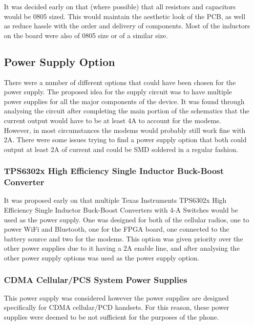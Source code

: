 It was decided early on that (where possible) that all resistors and capacitors would be 0805 sized. 
This would maintain the aesthetic look of the PCB, as well as reduce hassle with the order and delivery of components. 
Most of the inductors on the board were also of 0805 size or of a similar size. 


\subsection{Power Supply Option}

	There were a number of different options that could have been chosen for the power supply. 
The proposed idea for the supply circuit was to have multiple power supplies for all the major components of the device. 
It was found through analysing the circuit after completing the main portion of the schematics that the current output would have to be at least 4A to account for the modems. 
However, in most circumstances the modems would probably still work fine with 2A. 
There were some issues trying to find a power supply option that both could output at least 2A of current and could be SMD soldered in a regular fashion. 

\subsubsection{TPS6302x High Efficiency Single Inductor Buck-Boost Converter}

It was proposed early on that multiple Texas Instruments TPS6302x High Efficiency Single Inductor Buck-Boost Converters with 4-A Switches would be used as the power supply. 
One was designed for both of the cellular radios, one to power WiFi and Bluetooth, one for the FPGA board, one connected to the battery source and two for the modems. 
This option was given priority over the other power supplies due to it having a 2A enable line, and after analysing the other power supply options was used as the power supply option. 


\subsubsection{CDMA Cellular/PCS System Power Supplies}

This power supply was considered however the power supplies are designed specifically for CDMA cellular/PCD handsets. For this reason, these power supplies were deemed to be not sufficient for the purposes of the phone. 

